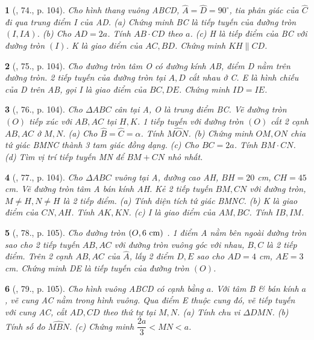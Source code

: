 \documentclass{article}
\newtheorem{baitoan}{}
\begin{document}
\begin{baitoan}[\cite{Binh_Toan_9_tap_1}, 74., p. 104]
	Cho hình thang vuông ABCD, $\widehat{A} = \widehat{D} = 90^\circ$, tia phân giác của $\widehat{C}$ đi qua trung điểm I của AD. (a) Chứng minh BC là tiếp tuyến của đường tròn $(I,IA)$. (b) Cho $AD = 2a$. Tính $AB\cdot CD$ theo $a$. (c) H là tiếp điểm của BC với đường tròn $(I)$. K là giao điểm của $AC,BD$. Chứng minh $KH\parallel CD$.
\end{baitoan}

\begin{baitoan}[\cite{Binh_Toan_9_tap_1}, 75., p. 104]
	Cho đường tròn tâm O có đường kính AB, điểm D nằm trên đường tròn. 2 tiếp tuyến của đường tròn tại $A,D$ cắt nhau ở C. E là hình chiếu của D trên AB, gọi I là giao điểm của $BC,DE$. Chứng minh $ID = IE$.
\end{baitoan}

\begin{baitoan}[\cite{Binh_Toan_9_tap_1}, 76., p. 104]
	Cho $\Delta ABC$ cân tại A, O là trung điểm BC. Vẽ đường tròn $(O)$ tiếp xúc với $AB,AC$ tại $H,K$. 1 tiếp tuyến với đường tròn $(O)$ cắt 2 cạnh $AB,AC$ ở $M,N$. (a) Cho $\widehat{B} = \widehat{C} = \alpha$. Tính $\widehat{MON}$. (b) Chứng minh $OM,ON$ chia tứ giác BMNC thành 3 tam giác đồng dạng. (c) Cho $BC = 2a$. Tính $BM\cdot CN$. (d) Tìm vị trí tiếp tuyến MN để $BM + CN$ nhỏ nhất.
\end{baitoan}

\begin{baitoan}[\cite{Binh_Toan_9_tap_1}, 77., p. 104]
	Cho $\Delta ABC$ vuông tại A, đường cao AH, $BH = 20$ {\rm cm}, $CH = 45$ {\rm cm}. Vẽ đường tròn tâm A bán kính AH. Kẻ 2 tiếp tuyến $BM,CN$ với đường tròn, $M\ne H,N\ne H$ là 2 tiếp điểm. (a) Tính diện tích tứ giác BMNC. (b) K là giao điểm của $CN,AH$. Tính $AK,KN$. (c) I là giao điểm của $AM,BC$. Tính $IB,IM$.
\end{baitoan}

\begin{baitoan}[\cite{Binh_Toan_9_tap_1}, 78., p. 105]
	Cho đường tròn $(O,6\ {\rm cm})$ . 1 điểm A nằm bên ngoài đường tròn sao cho 2 tiếp tuyến $AB,AC$ với đường tròn vuông góc với nhau, $B,C$ là 2 tiếp điểm. Trên 2 cạnh $AB,AC$ của $\widehat{A}$, lấy 2 điểm $D,E$ sao cho $AD = 4$ {\rm cm}, $AE = 3$ {\rm cm}. Chứng minh DE là tiếp tuyến của đường tròn $(O)$.
\end{baitoan}

\begin{baitoan}[\cite{Binh_Toan_9_tap_1}, 79., p. 105]
	Cho hình vuông ABCD có cạnh bằng $a$. Với tâm B \& bán kính $a$, vẽ cung AC nằm trong hình vuông. Qua điểm E thuộc cung đó, vẽ tiếp tuyến với cung AC, cắt $AD,CD$ theo thứ tự tại $M,N$. (a) Tính chu vi $\Delta DMN$. (b) Tính số đo $\widehat{MBN}$. (c) Chứng minh $\dfrac{2a}{3} < MN < a$.
\end{baitoan}
\end{document}
